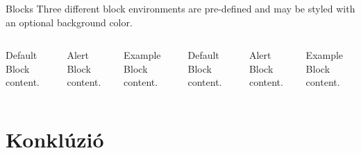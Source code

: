 \documentclass[10pt]{beamer}
\begin{document}
\begin{frame}{Blocks}
  Three different block environments are pre-defined and may be styled with an
  optional background color.

  \begin{columns}[T,onlytextwidth]
      \begin{block}{Default}
        Block content.
      \end{block}

      \begin{alertblock}{Alert}
        Block content.
      \end{alertblock}

      \begin{exampleblock}{Example}
        Block content.
      \end{exampleblock}



      \begin{block}{Default}
        Block content.
      \end{block}

      \begin{alertblock}{Alert}
        Block content.
      \end{alertblock}

      \begin{exampleblock}{Example}
        Block content.
      \end{exampleblock}

  \end{columns}
\end{frame}

\section{Konklúzió}
\end{document}
